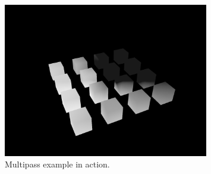 \documentclass[12pt]{report}
\theoremstyle{definition}
\begin{document}
      \begin{figure}[h]
        \centering
        \includegraphics[width=0.8\textwidth]{images/multipass_example.png}
        \caption{Multipass example in action.}
        \label{fig:multipass_example}  
      \end{figure}
\end{document}
